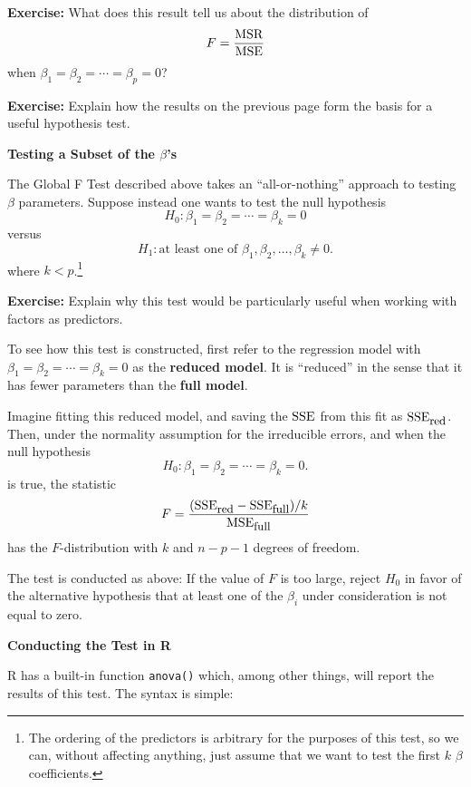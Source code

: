 \documentclass{report}
\begin{document}
\textcolor{qcol}{{\bf Exercise:} What does this result tell
us about the distribution of
\[
   F = \frac{{\rm MSR}}{{\rm MSE}}
\]
when $\beta_1 = \beta_2 = \cdots = \beta_{p} = 0$?}


\newpage
\textcolor{qcol}{{\bf Exercise:} Explain how the results on the
previous page form the basis for a useful hypothesis test.}


\newpage
\makerule
{\bf \LARGE Testing a Subset of the $\beta$'s}

The Global F Test described above takes an ``all-or-nothing''
approach to testing $\beta$ parameters. Suppose instead one wants to
test the null hypothesis
\[
   H_0\!: \beta_1 = \beta_2 = \cdots = \beta_k = 0
\]
versus
\[
   H_1\!: \mbox{at least one of $\beta_1, \beta_2, \ldots, \beta_k \neq 0$}.
\]
where $k < p$.\footnote{The ordering of the predictors is arbitrary
for the purposes of this test, so we can, without affecting anything, just
assume that we want to test the first $k$ $\beta$ coefficients.}

\textcolor{qcol}{{\bf Exercise:} Explain why this test would be particularly
useful when working with factors as predictors.}


\newpage
To see how this test is constructed, first refer to the regression model
with $\beta_1 = \beta_2 = \cdots = \beta_k =0$ as the {\bf reduced model}.
It is ``reduced'' in the sense that it has fewer parameters than the
{\bf full model}.

Imagine fitting this reduced model, and saving the ${\rm SSE}$ from this fit
as ${\rm SSE}_{\mbox{\small red}}$. Then, under the normality assumption for
the irreducible errors, and when the null hypothesis
\[
   H_0\!:\beta_1 = \beta_2 = \cdots = \beta_k=0.
\]
is true, the statistic
\[
   F = \frac{\left({\rm SSE}_{\mbox{\small red}} - 
   {\rm SSE}_{\mbox{\small full}}\right)\!/k}{{\rm MSE}_{\mbox{\small full}}}
\]
has the $F$-distribution with $k$ and $n-p-1$ degrees of freedom.

The test is conducted as above: If the value of $F$ is too large, reject
$H_0$ in favor of the alternative hypothesis that at least one of the 
$\beta_i$ under consideration is not equal to zero.

\newpage
{\bf Conducting the Test in R}

R has a built-in function {\tt anova()} which, among other things,
will report the results of this test. The syntax is simple:
\end{document}

